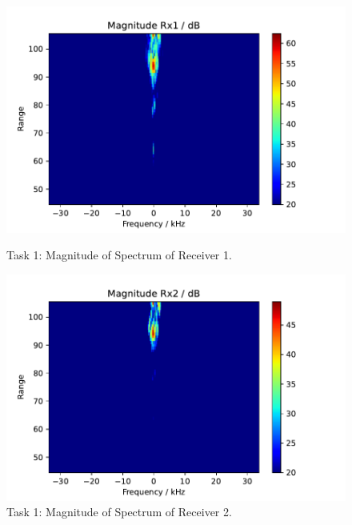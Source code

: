 \begin{figure}
    \centering
    \begin{minipage}{0.48\textwidth}
        \centering
        \includegraphics[width=\textwidth]{graphics/t1/t1-mag-rx1.pdf}
    \caption{Task 1: Magnitude of Spectrum of Receiver 1.}
    \label{fig:t1-mag-rx1}
    \end{minipage}\hfill
    \begin{minipage}{0.48\textwidth}
        \centering
        \includegraphics[width=\textwidth]{graphics/t1/t1-mag-rx2.pdf}
    \caption{Task 1: Magnitude of Spectrum of Receiver 2.}
    \label{fig:t1-mag-rx2}
    \end{minipage}
\end{figure}

